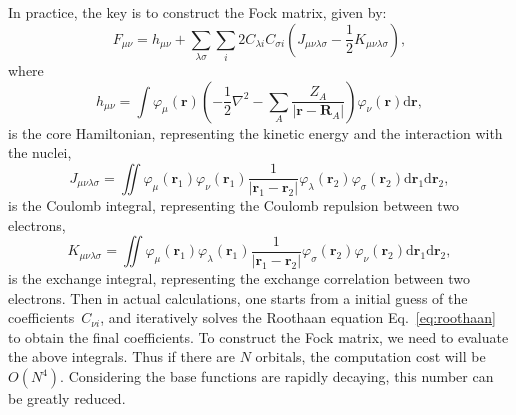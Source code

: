 \documentclass[prb,preprintnumbers,amsmath,amssymb, 11pt]{revtex4}
\newcommand{\abs}[1]{\left|#1\right|} %
\begin{document}
In practice, the key is to construct the Fock matrix, given by:
\begin{equation}
    F_{\mu \nu} = h_{\mu \nu} + \sum_{\lambda \sigma} \sum_{i} 2 C_{\lambda i} C_{\sigma i} (J_{\mu \nu \lambda \sigma} - \frac{1}{2} K_{\mu \nu \lambda \sigma}),
\end{equation}
where
\begin{equation}\label{eq:core-hamiltonian}
    h_{\mu \nu} = \int \varphi_{\mu}(\mathbf{r}) \left( -\frac{1}{2} \nabla^2 - \sum_{A} \frac{Z_A}{\abs{\mathbf{r} - \mathbf{R}_A}} \right) \varphi_{\nu}(\mathbf{r}) \mathrm{d}\mathbf{r},
\end{equation}
is the core Hamiltonian, representing the kinetic energy and the interaction with the nuclei,
\begin{equation}\label{eq:coulomb-integral}
    J_{\mu \nu \lambda \sigma} = \iint \varphi_{\mu}(\mathbf{r}_1) \varphi_{\nu}(\mathbf{r}_1) \frac{1}{|\mathbf{r}_1 - \mathbf{r}_2|} \varphi_{\lambda}(\mathbf{r}_2) \varphi_{\sigma}(\mathbf{r}_2) \mathrm{d}\mathbf{r}_1 \mathrm{d}\mathbf{r}_2,
\end{equation}
is the Coulomb integral, representing the Coulomb repulsion between two electrons,
\begin{equation}\label{eq:exchange-integral}
    K_{\mu \nu \lambda \sigma} = \iint \varphi_{\mu}(\mathbf{r}_1) \varphi_{\lambda}(\mathbf{r}_1) \frac{1}{|\mathbf{r}_1 - \mathbf{r}_2|} \varphi_{\sigma}(\mathbf{r}_2) \varphi_{\nu}(\mathbf{r}_2) \mathrm{d}\mathbf{r}_1 \mathrm{d}\mathbf{r}_2,
\end{equation}
is the exchange integral, representing the exchange correlation between two electrons.
Then in actual calculations, one starts from a initial guess of the coefficients~$C_{\nu i}$, and iteratively solves the Roothaan equation Eq.~\eqref{eq:roothaan} to obtain the final coefficients.
To construct the Fock matrix, we need to evaluate the above integrals. 
Thus if there are $N$ orbitals, the computation cost will be $O(N^4)$.
Considering the base functions are rapidly decaying, this number can be greatly reduced.



\end{document}
